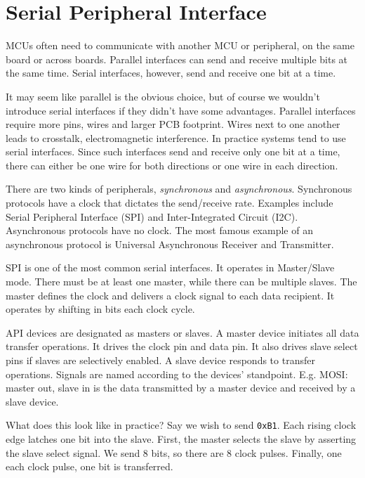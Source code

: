 \section{Serial Peripheral Interface}

MCUs often need to communicate with
another MCU or peripheral, on the
same board or across boards. Parallel
interfaces can send and receive multiple
bits at the same time. Serial interfaces,
however, send and receive one bit at
a time.

It may seem like parallel is the obvious
choice, but of course we wouldn't
introduce serial interfaces if they didn't
have some advantages. Parallel interfaces
require more pins, wires and larger
PCB footprint. Wires next to one another
leads to crosstalk, electromagnetic
interference.
In practice systems tend to use serial
interfaces. Since such interfaces send
and receive only one bit at a time,
there can either be one wire for both
directions or one wire in each direction.

There are two kinds of peripherals,
\emph{synchronous} and \emph{asynchronous}.
Synchronous protocols have a clock
that dictates the send/receive rate.
Examples include Serial Peripheral Interface
(SPI) and Inter-Integrated Circuit (I2C).
Asynchronous protocols have no clock.
The most famous example of an asynchronous
protocol is Universal Asynchronous
Receiver and Transmitter.

SPI is one of the most common serial
interfaces. It operates in Master/Slave
mode. There must be at least one master,
while there can be multiple slaves. The
master defines the clock and delivers a
clock signal to each data recipient.
It operates by shifting in bits each
clock cycle.

API devices are designated as masters
or slaves. A master device initiates
all data transfer operations. It drives
the clock pin and data pin. It also
drives slave select pins if slaves are
selectively enabled. A slave device
responds to transfer operations. Signals
are named according to the devices' standpoint.
E.g. MOSI: master out, slave in is the
data transmitted by a master device
and received by a slave device.

What does this look like in practice? Say
we wish to send \texttt{0xB1}. Each rising
clock edge latches one bit into the slave.
First, the master selects the slave by asserting
the slave select signal. We send 8 bits,
so there are 8 clock pulses. Finally, one
each clock pulse, one bit is transferred.

